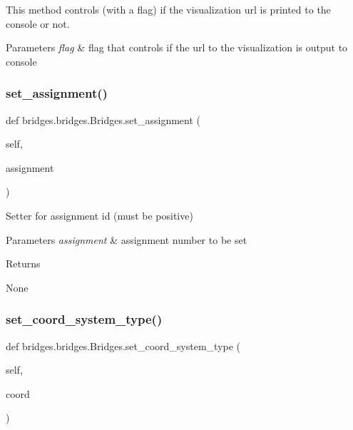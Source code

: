 This method controls (with a flag) if the visualization url is printed to the console or not. 


\begin{DoxyParams}{Parameters}
{\em flag} & flag that controls if the url to the visualization is output to console \\
\hline
\end{DoxyParams}
\mbox{\label{classbridges_1_1bridges_1_1_bridges_add46441bec1c93095c48adc724b90e12}} 
\subsubsection{\texorpdfstring{set\+\_\+assignment()}{set\_assignment()}}
{\footnotesize\ttfamily def bridges.\+bridges.\+Bridges.\+set\+\_\+assignment (\begin{DoxyParamCaption}\item[{}]{self,  }\item[{}]{assignment }\end{DoxyParamCaption})}



Setter for assignment id (must be positive) 


\begin{DoxyParams}{Parameters}
{\em assignment} & assignment number to be set \\
\hline
\end{DoxyParams}
\begin{DoxyReturn}{Returns}


None 
\end{DoxyReturn}
\mbox{\label{classbridges_1_1bridges_1_1_bridges_a6bc905490b1995234f88f47af9aa8a17}} 
\subsubsection{\texorpdfstring{set\+\_\+coord\+\_\+system\+\_\+type()}{set\_coord\_system\_type()}}
{\footnotesize\ttfamily def bridges.\+bridges.\+Bridges.\+set\+\_\+coord\+\_\+system\+\_\+type (\begin{DoxyParamCaption}\item[{}]{self,  }\item[{}]{coord }\end{DoxyParamCaption})}



